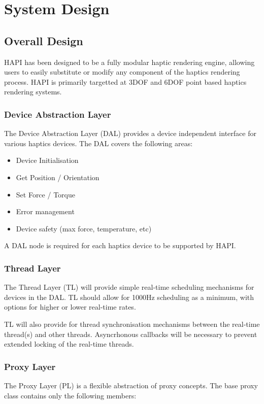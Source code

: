 
\chapter {System Design}


\section{Overall Design}

HAPI has been designed to be a fully modular haptic rendering engine,
allowing users to easily substitute or modify any component of the
haptics rendering process. HAPI is primarily targetted at 3DOF and
6DOF point based haptics rendering systems.



\subsection{Device Abstraction Layer}
The Device Abstraction Layer (DAL) provides a device independent
interface for various haptics devices. The DAL covers the following
areas:

\begin{itemize}
\item Device Initialisation
\item Get Position / Orientation 
\item Set Force / Torque
\item Error management
\item Device safety (max force, temperature, etc)
\end{itemize}

A DAL node is required for each haptics device to be supported by HAPI.


\subsection{Thread Layer}
The Thread Layer (TL) will provide simple real-time scheduling
mechanisms for devices in the DAL. TL should allow for 1000Hz
scheduling as a minimum, with options for higher or lower real-time
rates.

TL will also provide for thread synchronisation mechanisms between the
real-time thread(s) and other threads.  Asyncrhonous callbacks will be
necessary to prevent extended locking of the real-time threads.


\subsection{Proxy Layer}
The Proxy Layer (PL) is a flexible abstraction of proxy concepts. The
base proxy class contains only the following members:

